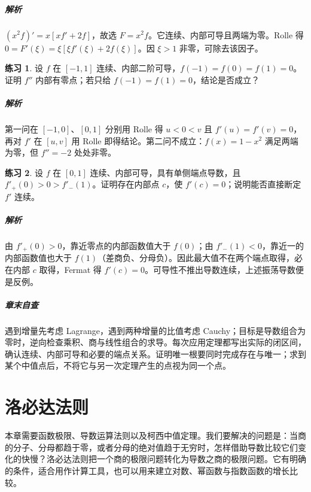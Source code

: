 \documentclass[UTF8,fontset=fandol,12pt,oneside,openany]{ctexrep}
\theoremstyle{definition}
\newtheorem{exercise}{练习}[chapter]
\begin{document}
\paragraph{解析}
$(x^2f)'=x[xf'+2f]$，故选 $F=x^2f$。它连续、内部可导且两端为零。Rolle 得 $0=F'(\xi)=\xi[\xi f'(\xi)+2f(\xi)]$。因 $\xi>1$ 非零，可除去该因子。

\begin{exercise}
设 $f$ 在 $[-1,1]$ 连续、内部二阶可导，$f(-1)=f(0)=f(1)=0$。证明 $f''$ 内部有零点；若只给 $f(-1)=f(1)=0$，结论是否成立？
\end{exercise}
\paragraph{解析}
第一问在 $[-1,0]$、$[0,1]$ 分别用 Rolle 得 $u<0<v$ 且 $f'(u)=f'(v)=0$，再对 $f'$ 在 $[u,v]$ 用 Rolle 即得结论。第二问不成立：$f(x)=1-x^2$ 满足两端为零，但 $f''=-2$ 处处非零。

\begin{exercise}
设 $f$ 在 $[0,1]$ 连续、内部可导，具有单侧端点导数，且 $f'_+(0)>0>f'_-(1)$。证明存在内部点 $c$，使 $f'(c)=0$；说明能否直接断定 $f'$ 连续。
\end{exercise}
\paragraph{解析}
由 $f'_+(0)>0$，靠近零点的内部函数值大于 $f(0)$；由 $f'_-(1)<0$，靠近一的内部函数值也大于 $f(1)$（差商负、分母负）。因此最大值不在两个端点取得，必在内部 $c$ 取得，Fermat 得 $f'(c)=0$。可导性不推出导数连续，上述振荡导数便是反例。

\paragraph{章末自查}
遇到增量先考虑 Lagrange，遇到两种增量的比值考虑 Cauchy；目标是导数组合为零时，逆向检查乘积、商与线性组合的求导。每次应用定理都写出实际的闭区间，确认连续、内部可导和必要的端点关系。证明唯一根要同时完成存在与唯一；求到某个中值点后，不将它与另一次定理产生的点视为同一个点。


\chapter{洛必达法则}
\label{lec:07:chapter}

本章需要函数极限、导数运算法则以及柯西中值定理。我们要解决的问题是：当商的分子、分母都趋于零，或者分母的绝对值趋于无穷时，怎样借助导数比较它们变化的快慢？洛必达法则把一个商的极限问题转化为导数之商的极限问题。它有明确的条件，适合用作计算工具，也可以用来建立对数、幂函数与指数函数的增长比较。
\end{document}
